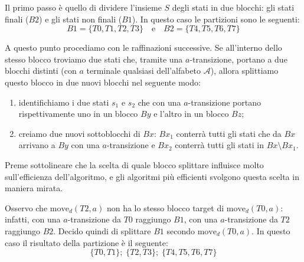 \documentclass[class=book, crop=false, oneside, 12pt]{standalone}
\begin{document}
Il primo passo è quello di dividere l'insieme \(S\) degli stati in due blocchi: gli stati finali (\(B2\)) e gli stati non finali (\(B1\)).
In questo caso le partizioni sono le seguenti:
\begin{equation*}
    B1 = \{T0,T1,T2,T3\} \quad \textrm{e} \quad B2 = \{T4,T5,T6,T7\}
\end{equation*}

A questo punto procediamo con le raffinazioni successive. Se all’interno dello stesso blocco troviamo due stati che, tramite una \(a\)-transizione, portano a due blocchi distinti (con \(a\) terminale qualsiasi dell’alfabeto \(\mathcal{A}\)), allora splittiamo questo blocco in due nuovi blocchi nel seguente modo:
\begin{enumerate}
    \item identifichiamo i due stati \(s_1\) e \(s_2\) che con una \(a\)-transizione portano rispettivamente uno in un blocco \(By\) e l’altro in un blocco \(Bz\);
    \item creiamo due nuovi sottoblocchi di \(Bx\): \(Bx_{1}\) conterrà tutti gli stati che da \(Bx\) arrivano a \(By\) con una \(a\)-transizione e \(Bx_{2}\) conterrà tutti gli stati in \(Bx \setminus Bx_{1}\).
\end{enumerate} 
Preme sottolineare che la scelta di quale blocco splittare influisce molto sull’efficienza dell’algoritmo, e gli algoritmi più efficienti svolgono questa scelta in maniera mirata.

Osservo che \(\textrm{move}_d (T2,a)\) non ha lo stesso blocco target di \(\textrm{move}_d (T0,a) \): infatti, con una \(a\)-transizione da \(T0\) raggiungo \(B1\), con una \(a\)-transizione da \(T2\) raggiungo \(B2\). Decido quindi di splittare \(B1\) secondo \(\textrm{move}_d (T0,a) \). In questo caso il risultato della partizione è il seguente:
\begin{equation*}
    \{T0, T1\};\; \{T2, T3\};\; \{T4,T5,T6,T7\}
\end{equation*}
\end{document}
